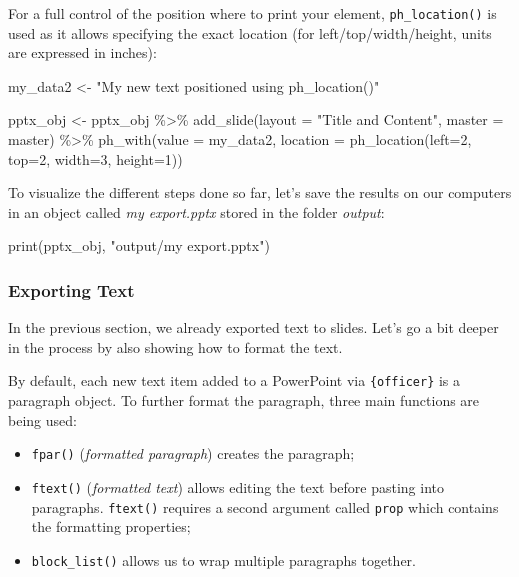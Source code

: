 \documentclass[
]{krantz}
\makeatletter
\newenvironment{Shaded}{\begin{snugshade}}{\end{snugshade}}
\newcommand{\AttributeTok}[1]{\textcolor[rgb]{0.61,0.61,0.61}{#1}}
\newcommand{\DecValTok}[1]{\textcolor[rgb]{0.06,0.06,0.06}{#1}}
\newcommand{\FunctionTok}[1]{\textcolor[rgb]{0,0,0}{#1}}
\newcommand{\NormalTok}[1]{#1}
\newcommand{\OtherTok}[1]{\textcolor[rgb]{0.37,0.37,0.37}{#1}}
\newcommand{\SpecialCharTok}[1]{\textcolor[rgb]{0,0,0}{#1}}
\newcommand{\StringTok}[1]{\textcolor[rgb]{0.5,0.5,0.5}{#1}}
\providecommand{\tightlist}{%
  \setlength{\itemsep}{0pt}\setlength{\parskip}{0pt}}
\newenvironment{kframe}{%
\medskip{}
\setlength{\fboxsep}{.8em}
 \def\at@end@of@kframe{}%
 \ifinner\ifhmode%
  \def\at@end@of@kframe{\end{minipage}}%
  \begin{minipage}{\columnwidth}%
 \fi\fi%
 \def\FrameCommand##1{\hskip\@totalleftmargin \hskip-\fboxsep
 \colorbox{shadecolor}{##1}\hskip-\fboxsep
     \hskip-\linewidth \hskip-\@totalleftmargin \hskip\columnwidth}%
 \MakeFramed {\advance\hsize-\width
   \@totalleftmargin\z@ \linewidth\hsize
   \@setminipage}}%
 {\par\unskip\endMakeFramed%
 \at@end@of@kframe}
\renewenvironment{Shaded}{\begin{kframe}}{\end{kframe}}
\makeatother
\begin{document}
For a full control of the position where to print your element, \texttt{ph\_location()} is used as it allows specifying the exact location (for left/top/width/height, units are expressed in inches):

\begin{Shaded}
\begin{Highlighting}[]
\NormalTok{my\_data2 }\OtherTok{\textless{}{-}} \StringTok{"My new text positioned using ph\_location()"}

\NormalTok{pptx\_obj }\OtherTok{\textless{}{-}}\NormalTok{ pptx\_obj }\SpecialCharTok{\%\textgreater{}\%}
  \FunctionTok{add\_slide}\NormalTok{(}\AttributeTok{layout =} \StringTok{"Title and Content"}\NormalTok{, }\AttributeTok{master =}\NormalTok{ master) }\SpecialCharTok{\%\textgreater{}\%} 
  \FunctionTok{ph\_with}\NormalTok{(}\AttributeTok{value =}\NormalTok{ my\_data2, }
          \AttributeTok{location =} \FunctionTok{ph\_location}\NormalTok{(}\AttributeTok{left=}\DecValTok{2}\NormalTok{, }\AttributeTok{top=}\DecValTok{2}\NormalTok{, }\AttributeTok{width=}\DecValTok{3}\NormalTok{, }\AttributeTok{height=}\DecValTok{1}\NormalTok{))}
\end{Highlighting}
\end{Shaded}

To visualize the different steps done so far, let's save the results on our computers in an object called \emph{my export.pptx} stored in the folder \emph{output}:

\begin{Shaded}
\begin{Highlighting}[]
\FunctionTok{print}\NormalTok{(pptx\_obj, }\StringTok{"output/my export.pptx"}\NormalTok{)}
\end{Highlighting}
\end{Shaded}

\hypertarget{exporting-text}{%
\subsubsection{Exporting Text}\label{exporting-text}}

In the previous section, we already exported text to slides. Let's go a bit deeper in the process by also showing how to format the text.

By default, each new text item added to a PowerPoint via \texttt{\{officer\}} is a paragraph object. To further format the paragraph, three main functions are being used:

\begin{itemize}
\tightlist
\item
  \texttt{fpar()} (\emph{formatted paragraph}) creates the paragraph;
\item
  \texttt{ftext()} (\emph{formatted text}) allows editing the text before pasting into paragraphs. \texttt{ftext()} requires a second argument called \texttt{prop} which contains the formatting properties;
\item
  \texttt{block\_list()} allows us to wrap multiple paragraphs together.
\end{itemize}
\end{document}
